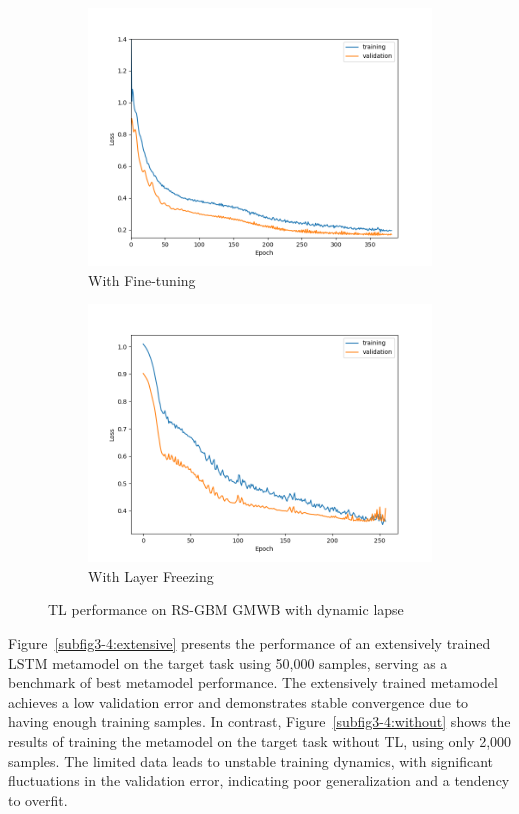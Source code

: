 \begin{figure}[ht!]
\begin{subfigure}{0.48\textwidth}
        \includegraphics[width=\textwidth]{./project3/figures/figure4c.png}
        \caption{With Fine-tuning}
        \label{subfig3-4:fineTuning}
    \end{subfigure}\hfill
    \begin{subfigure}{0.48\textwidth}
        \includegraphics[width=\textwidth]{./project3/figures/figure4d.png}
        \caption{With Layer Freezing}
        \label{subfig3-4:layerFreezing}
    \end{subfigure}
    \caption{TL performance on RS-GBM GMWB with dynamic lapse}
    \label{fig3:figure4}
\end{figure}

Figure~\ref{subfig3-4:extensive} presents the performance of an extensively trained LSTM metamodel on the target task using 50,000 samples, serving as a benchmark of best metamodel performance. 
The extensively trained metamodel achieves a low validation error and demonstrates stable convergence due to having enough training samples. 
In contrast, Figure~\ref{subfig3-4:without} shows the results of training the metamodel on the target task without TL, using only 2,000 samples. The limited data leads to unstable training dynamics, with significant fluctuations in the validation error, indicating poor generalization and a tendency to overfit.

